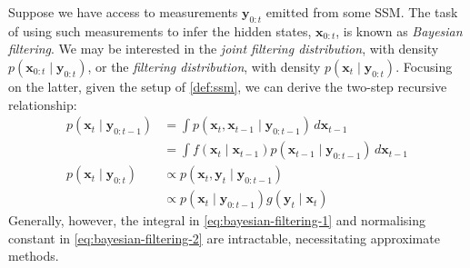 \begin{definition} \label{def:bayesian-filtering}
    Suppose we have access to measurements $\mathbf{y}_{0:t}$ emitted from some
    SSM. The task of using such measurements to infer the hidden states, $\mathbf{x}_{0:t}$, is
    known as \emph{Bayesian filtering}. We may be interested in the
    \emph{joint filtering distribution}, with density $p(\mathbf{x}_{0:t} \mid \mathbf{y}_{0:t})$,
    or the \emph{filtering distribution}, with density $p(\mathbf{x}_t \mid \mathbf{y}_{0:t})$.
    Focusing on the latter, given the setup of \autoref{def:ssm}, we can derive the two-step recursive
    relationship:
    \begin{align}
        p(\mathbf{x}_t \mid \mathbf{y}_{0:t-1}) &= \int p(\mathbf{x}_t, \mathbf{x}_{t-1} \mid \mathbf{y}_{0:t-1})\, d\mathbf{x}_{t-1} \nonumber \\
        &= \int f(\mathbf{x}_t \mid \mathbf{x}_{t - 1})p(\mathbf{x}_{t-1} \mid \mathbf{y}_{0:t-1})\, d\mathbf{x}_{t-1} \label{eq:bayesian-filtering-1} \\
        p(\mathbf{x}_t \mid \mathbf{y}_{0:t}) &\propto p(\mathbf{x}_t, \mathbf{y}_t \mid \mathbf{y}_{0:t-1}) \nonumber \\
        &\propto p(\mathbf{x}_t \mid \mathbf{y}_{0:t-1})g(\mathbf{y}_t \mid \mathbf{x}_t) \label{eq:bayesian-filtering-2}
    \end{align}
    Generally, however, the integral in \autoref{eq:bayesian-filtering-1} and normalising constant in
    \autoref{eq:bayesian-filtering-2} are intractable, necessitating approximate methods.
\end{definition}


